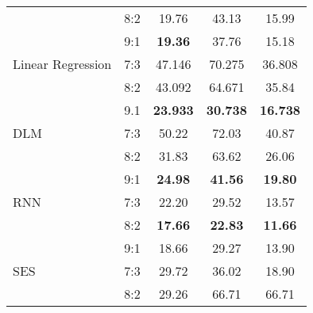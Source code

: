 \documentclass[conference]{IEEEtran}
\begin{document}
\begin{table}[ht]
\begin{tabular}{|l|l|c|c|c|}
                               & 8:2                         & 19.76                     & 43.13                          & 15.99                    \\ \cline{2-5}
                               & 9:1                         & \textbf{19.36}            & 37.76                          & 15.18                    \\ \hline
        Linear Regression      & 7:3                         & 47.146                    & 70.275                         & 36.808                   \\ \cline{2-5}
                               & 8:2                         & 43.092                    & 64.671                         & 35.84                    \\ \cline{2-5}
                               & 9.1                         & \textbf{23.933}           & \textbf{30.738}                & \textbf{16.738}          \\ \hline
        DLM                    & 7:3                         & 50.22                     & 72.03                          & 40.87                    \\ \cline{2-5}
                               & 8:2                         & 31.83                     & 63.62                          & 26.06                    \\ \cline{2-5}
                               & 9:1                         & \textbf{24.98}            & \textbf{41.56}                 & \textbf{19.80}           \\ \hline
        RNN                    & 7:3                         & 22.20                     & 29.52                          & 13.57                    \\ \cline{2-5}
                               & 8:2                         & \textbf{17.66}            & \textbf{22.83}                 & \textbf{11.66}           \\ \cline{2-5}
                               & 9:1                         & 18.66                     & 29.27                          & 13.90                    \\ \hline
        SES                    & 7:3                         & 29.72                     & 36.02                          & 18.90                    \\ \cline{2-5}
                               & 8:2                         & 29.26                     & 66.71                          & 66.71                    \\ \cline{2-5}

\end{tabular}
\end{table}
\end{document}
